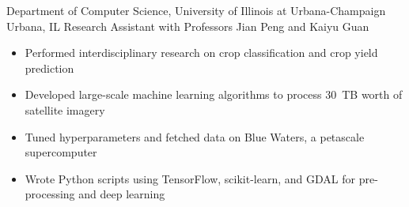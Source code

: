 
        {Department of Computer Science, University of Illinois at Urbana-Champaign}
        {Urbana, IL}
        {Research Assistant}
        {with Professors Jian Peng and Kaiyu Guan}{
    \begin{itemize}
        \item Performed interdisciplinary research on crop classification and crop yield prediction
        \item Developed large-scale machine learning algorithms to process 30~TB worth of satellite imagery
        \item Tuned hyperparameters and fetched data on Blue Waters, a petascale supercomputer
        \item Wrote Python scripts using TensorFlow, scikit-learn, and GDAL for pre-processing and deep learning
    \end{itemize}
}
